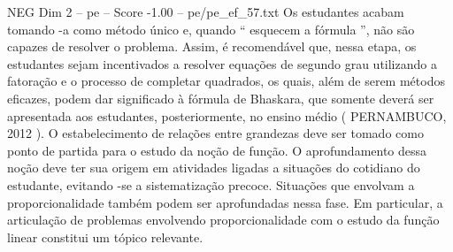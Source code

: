 \begin{textsample}{NEG Dim 2 – pe – Score -1.00 – pe/pe\_ef\_57.txt}
Os estudantes acabam tomando -a como método único e, quando “ esquecem a fórmula ”, não são capazes de resolver o problema.
Assim, é recomendável que, nessa etapa, os estudantes sejam incentivados a resolver equações de segundo grau utilizando a fatoração e o processo de completar quadrados, os quais, além de serem métodos eficazes, podem dar significado à fórmula de Bhaskara, que somente deverá ser apresentada aos estudantes, posteriormente, no ensino médio ( PERNAMBUCO, 2012 ).
O estabelecimento de relações entre grandezas deve ser tomado como ponto de partida para o estudo da noção de função.
O aprofundamento dessa noção deve ter sua origem em atividades ligadas a situações do cotidiano do estudante, evitando -se a sistematização precoce.
Situações que envolvam a proporcionalidade também podem ser aprofundadas nessa fase.
Em particular, a articulação de problemas envolvendo proporcionalidade com o estudo da função linear constitui um tópico relevante.

\end{textsample}
